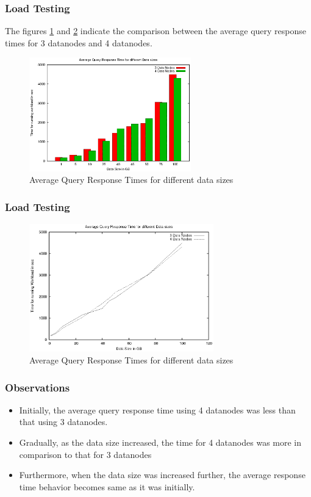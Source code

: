 \documentclass[12pt,xcolor=dvipsnames]{beamer}
\begin{document}
\begin{frame}
\frametitle{Load Testing}
 The figures \ref{barcomp} and \ref{linecomp} indicate the comparison between the average query response times for 3 datanodes and 4 datanodes.
\begin{figure}[h]
 \includegraphics[width=7cm]{bar_comparison.eps}
\caption{Average Query Response Times for different data sizes \label{barcomp}}
\end{figure}
\end{frame}

\begin{frame}
\frametitle{Load Testing}
\begin{figure}[h]
 \includegraphics[width=8cm]{line_comparison.eps}
\caption{Average Query Response Times for different data sizes \label{linecomp}}
\end{figure}
\end{frame}

\begin{frame}[t]
\frametitle{Observations}
\begin{itemize}
 \item Initially, the average query response time using 4 datanodes was less than that using 3 datanodes.
 \item Gradually, as the data size increased, the time for 4 datanodes was more in comparison to that for 3 datanodes
 \item Furthermore, when the data size was increased further, the average response time behavior becomes same as it was initially.
\end{itemize}
\end{frame}
\end{document}
